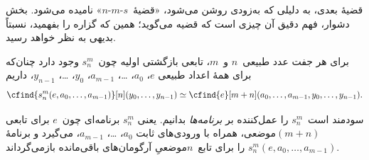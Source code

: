 \documentclass[../../../include/open-logic-section]{subfiles}
\begin{document}

\begin{explain}
قضیهٔ بعدی، به دلیلی که به‌زودی روشن می‌شود، «قضیهٔ~$s$-$m$-$n$»
نامیده می‌شود. بخش دشوار، فهم دقیق آن چیزی است که قضیه می‌گوید؛ همین
که گزاره را بفهمید، نسبتاً بدیهی به نظر خواهد رسید.
\end{explain}

\begin{thm}
  برای هر جفت عدد طبیعی~$n$ و~$m$، تابعی بازگشتی اولیه چون~$s^m_n$
  وجود دارد چنان‌که برای همهٔ اعداد طبیعی
  $e$، $a_0$، \dots، $a_{m-1}$، $y_0$، \dots، $y_{n-1}$، داریم
  \[
  \cfind{s^m_n(e, a_0, \dots, a_{m-1})}[n](y_0, \dots, y_{n-1}) \simeq
  \cfind{e}[m+n](a_0, \dots, a_{m-1}, y_0, \dots, y_{n-1}).
\]
\end{thm}

\begin{explain}
سودمند است~$s^m_n$ را عمل‌کننده بر 
\emph{برنامه‌ها} بدانیم. یعنی $s^m_n$ برنامه‌ای چون~$e$ برای تابعی
$(m+n)$موضعی، همراه با ورودی‌های ثابت
$a_0$، \dots، $a_{m-1}$، می‌گیرد و برنامهٔ
$s^m_n(e,a_0,\dots,a_{m-1})$ را برای تابع~$n$موضعیِ آرگومان‌های
باقی‌مانده بازمی‌گرداند. 
\end{explain}
\end{document}
